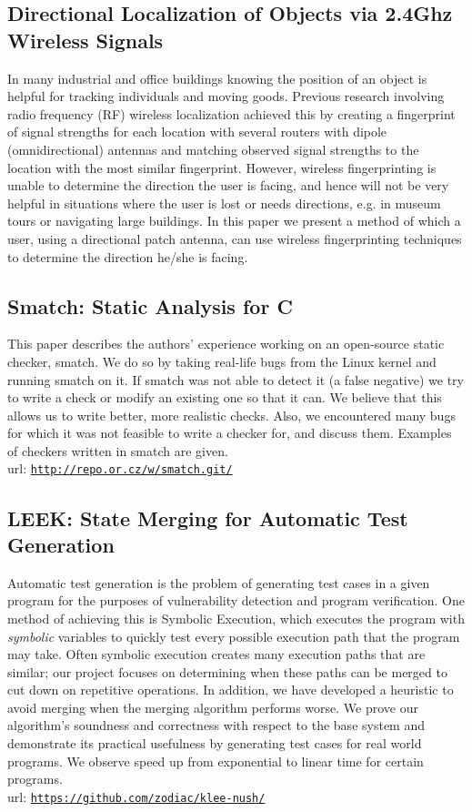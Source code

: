 \documentclass[letterpaper]{article}
\begin{document}
\subsection*{Directional Localization of Objects via 2.4Ghz Wireless Signals}
In many industrial and office buildings knowing the position of an object is helpful for tracking individuals and moving goods. Previous research involving radio frequency (RF) wireless localization achieved this by creating a fingerprint of signal strengths for each location with several routers with dipole (omnidirectional) antennas and matching observed signal strengths to the location with the most similar fingerprint. However, wireless fingerprinting is unable to determine the direction the user is facing, and hence will not be very helpful in situations where the user is lost or needs directions, e.g. in museum tours or navigating large buildings. In this paper we present a method of which a user, using a directional patch antenna, can use wireless fingerprinting techniques to determine the direction he/she is facing.

\subsection*{Smatch: Static Analysis for C}
This paper describes the authors' experience working on an open-source static checker, smatch. We do so by taking real-life bugs from the Linux kernel and running smatch on it. If smatch was not able to detect it (a false negative) we try to write a check or modify an existing one so that it can. We believe that this allows us to write better, more realistic checks. Also, we encountered many bugs for which it was not feasible to write a checker for, and discuss them. Examples of checkers written in smatch are given.
\\
url: \href{http://repo.or.cz/w/smatch.git}{\tt http://repo.or.cz/w/smatch.git/}

\subsection*{LEEK: State Merging for Automatic Test Generation}
Automatic test generation is the problem of generating test cases in a given program for the purposes of vulnerability detection and program verification. One method of achieving this is Symbolic Execution, which executes the program with \emph{symbolic} variables to quickly test every possible execution path that the program may take. Often symbolic execution creates many execution paths that are similar; our project focuses on determining when these paths can be merged to cut down on repetitive operations. In addition, we have developed a heuristic to avoid merging when the merging algorithm performs worse. We prove our algorithm's soundness and correctness with respect to the base system and demonstrate its practical usefulness by generating test cases for real world programs. We observe speed up from exponential to linear time for certain programs.
\\
url:
\href{https://github.com/zodiac/klee-nush}{\tt https://github.com/zodiac/klee-nush/}
\end{document}
